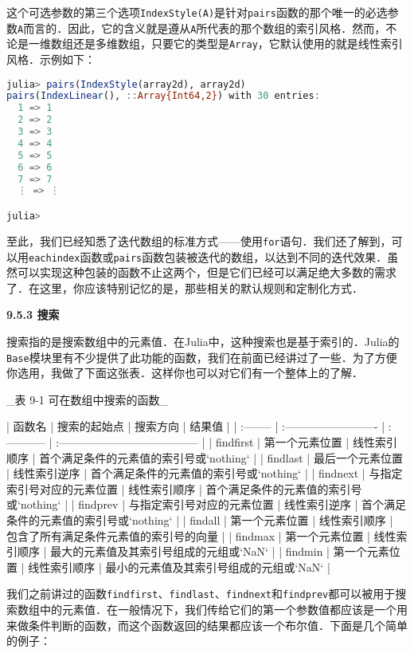 这个可选参数的第三个选项\verb|IndexStyle(A)|是针对\verb|pairs|函数的那个唯一的必选参数\verb|A|而言的．因此，它的含义就是遵从\verb|A|所代表的那个数组的索引风格．然而，不论是一维数组还是多维数组，只要它的类型是\verb|Array|，它默认使用的就是线性索引风格．示例如下：

\begin{lstlisting}[language=julia]
julia> pairs(IndexStyle(array2d), array2d)
pairs(IndexLinear(), ::Array{Int64,2}) with 30 entries:
  1 => 1
  2 => 2
  3 => 3
  4 => 4
  5 => 5
  6 => 6
  7 => 7
  ⋮ => ⋮

julia> 
\end{lstlisting}

至此，我们已经知悉了迭代数组的标准方式——使用\verb|for|语句．我们还了解到，可以用\verb|eachindex|函数或\verb|pairs|函数包装被迭代的数组，以达到不同的迭代效果．虽然可以实现这种包装的函数不止这两个，但是它们已经可以满足绝大多数的需求了．在这里，你应该特别记忆的是，那些相关的默认规则和定制化方式．

\textbf{9.5.3 搜索}

搜索指的是搜索数组中的元素值．在Julia中，这种搜索也是基于索引的．Julia的\verb|Base|模块里有不少提供了此功能的函数，我们在前面已经讲过了一些．为了方便你选用，我做了下面这张表．这样你也可以对它们有一个整体上的了解．

_表 9-1 可在数组中搜索的函数_

| 函数名    | 搜索的起始点               | 搜索方向     | 结果值                                  |
| :-------- | :------------------------- | :----------- | :-------------------------------------- |
| findfirst | 第一个元素位置             | 线性索引顺序 | 首个满足条件的元素值的索引号或`nothing` |
| findlast  | 最后一个元素位置           | 线性索引逆序 | 首个满足条件的元素值的索引号或`nothing` |
| findnext  | 与指定索引号对应的元素位置 | 线性索引顺序 | 首个满足条件的元素值的索引号或`nothing` |
| findprev  | 与指定索引号对应的元素位置 | 线性索引逆序 | 首个满足条件的元素值的索引号或`nothing` |
| findall   | 第一个元素位置             | 线性索引顺序 | 包含了所有满足条件元素值的索引号的向量  |
| findmax   | 第一个元素位置             | 线性索引顺序 | 最大的元素值及其索引号组成的元组或`NaN` |
| findmin   | 第一个元素位置             | 线性索引顺序 | 最小的元素值及其索引号组成的元组或`NaN` |

我们之前讲过的函数\verb|findfirst|、\verb|findlast|、\verb|findnext|和\verb|findprev|都可以被用于搜索数组中的元素值．在一般情况下，我们传给它们的第一个参数值都应该是一个用来做条件判断的函数，而这个函数返回的结果都应该一个布尔值．下面是几个简单的例子：

